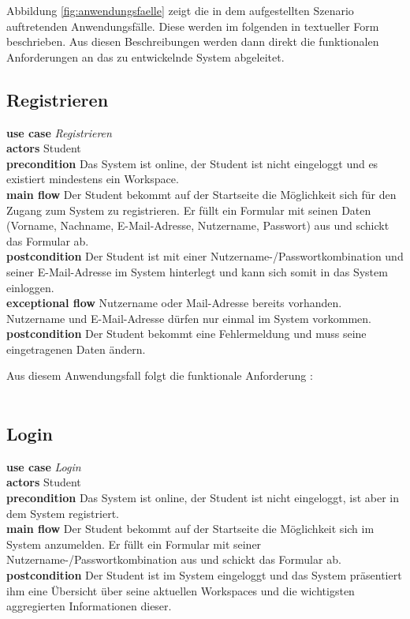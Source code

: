 Abbildung \ref{fig:anwendungsfaelle} zeigt die in dem aufgestellten Szenario auftretenden Anwendungsfälle. Diese werden im folgenden in textueller Form beschrieben. Aus diesen Beschreibungen werden dann direkt die funktionalen Anforderungen an das zu entwickelnde System abgeleitet.

\subsection{Registrieren}
\textbf{use case} \emph{Registrieren}\\
\textbf{actors} Student\\
\textbf{precondition} Das System ist online, der Student ist nicht eingeloggt und es existiert mindestens ein Workspace.\\
\textbf{main flow} Der Student bekommt auf der Startseite die Möglichkeit sich für den Zugang zum System zu registrieren. Er füllt ein Formular mit seinen Daten (Vorname, Nachname, E-Mail-Adresse, Nutzername, Passwort) aus und schickt das Formular ab.\\
\textbf{postcondition} Der Student ist mit einer Nutzername-/Passwortkombination und seiner E-Mail-Adresse im System hinterlegt und kann sich somit in das System einloggen.\\
\textbf{exceptional flow} Nutzername oder Mail-Adresse bereits vorhanden. Nutzername und E-Mail-Adresse dürfen nur einmal im System vorkommen.\\
\textbf{postcondition} Der Student bekommt eine Fehlermeldung und muss seine eingetragenen Daten ändern.
 
Aus diesem Anwendungsfall folgt die funktionale Anforderung :\\
\requirement{\requirementRegistrieren}\label{requirementRegistrieren}\\
 
\subsection{Login}
\textbf{use case} \emph{Login}\\
\textbf{actors} Student\\
\textbf{precondition} Das System ist online, der Student ist nicht eingeloggt, ist aber in dem System registriert.\\
\textbf{main flow} Der Student bekommt auf der Startseite die Möglichkeit sich im System anzumelden. Er füllt ein Formular mit seiner Nutzername-/Passwortkombination aus und schickt das Formular ab.\\
\textbf{postcondition} Der Student ist im System eingeloggt und das System präsentiert ihm eine Übersicht über seine aktuellen Workspaces und die wichtigsten aggregierten Informationen dieser.
 
